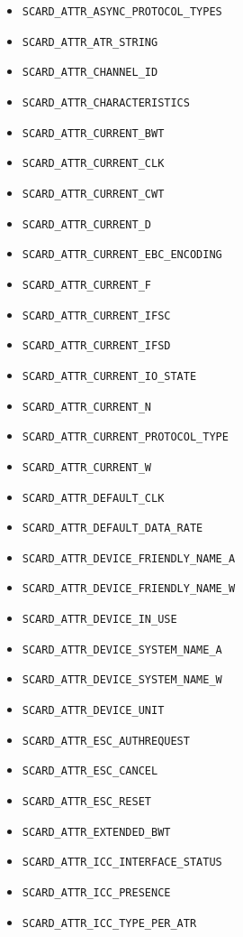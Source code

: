 \documentclass[a4paper,12pt]{article}
\begin{document}
\begin{itemize}
\item \texttt{SCARD\_ATTR\_ASYNC\_PROTOCOL\_TYPES}
\item \texttt{SCARD\_ATTR\_ATR\_STRING}
\item \texttt{SCARD\_ATTR\_CHANNEL\_ID}
\item \texttt{SCARD\_ATTR\_CHARACTERISTICS}
\item \texttt{SCARD\_ATTR\_CURRENT\_BWT}
\item \texttt{SCARD\_ATTR\_CURRENT\_CLK}
\item \texttt{SCARD\_ATTR\_CURRENT\_CWT}
\item \texttt{SCARD\_ATTR\_CURRENT\_D}
\item \texttt{SCARD\_ATTR\_CURRENT\_EBC\_ENCODING}
\item \texttt{SCARD\_ATTR\_CURRENT\_F}
\item \texttt{SCARD\_ATTR\_CURRENT\_IFSC}
\item \texttt{SCARD\_ATTR\_CURRENT\_IFSD}
\item \texttt{SCARD\_ATTR\_CURRENT\_IO\_STATE}
\item \texttt{SCARD\_ATTR\_CURRENT\_N}
\item \texttt{SCARD\_ATTR\_CURRENT\_PROTOCOL\_TYPE}
\item \texttt{SCARD\_ATTR\_CURRENT\_W}
\item \texttt{SCARD\_ATTR\_DEFAULT\_CLK}
\item \texttt{SCARD\_ATTR\_DEFAULT\_DATA\_RATE}
\item \texttt{SCARD\_ATTR\_DEVICE\_FRIENDLY\_NAME\_A}
\item \texttt{SCARD\_ATTR\_DEVICE\_FRIENDLY\_NAME\_W}
\item \texttt{SCARD\_ATTR\_DEVICE\_IN\_USE}
\item \texttt{SCARD\_ATTR\_DEVICE\_SYSTEM\_NAME\_A}
\item \texttt{SCARD\_ATTR\_DEVICE\_SYSTEM\_NAME\_W}
\item \texttt{SCARD\_ATTR\_DEVICE\_UNIT}
\item \texttt{SCARD\_ATTR\_ESC\_AUTHREQUEST}
\item \texttt{SCARD\_ATTR\_ESC\_CANCEL}
\item \texttt{SCARD\_ATTR\_ESC\_RESET}
\item \texttt{SCARD\_ATTR\_EXTENDED\_BWT}
\item \texttt{SCARD\_ATTR\_ICC\_INTERFACE\_STATUS}
\item \texttt{SCARD\_ATTR\_ICC\_PRESENCE}
\item \texttt{SCARD\_ATTR\_ICC\_TYPE\_PER\_ATR}

\end{itemize}
\end{document}
